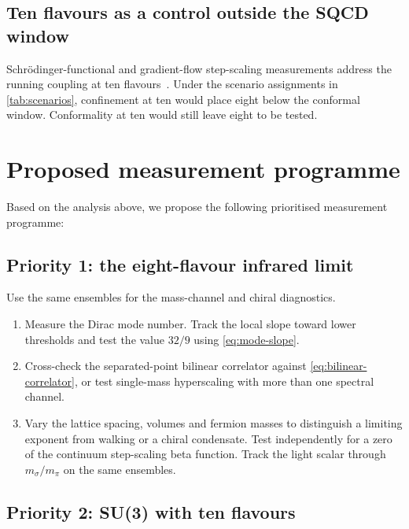 \documentclass[11pt,a4paper]{article}
\theoremstyle{plain}
\theoremstyle{definition}
\theoremstyle{remark}
\begin{document}
\subsection{Ten flavours as a control outside the SQCD window}

Schr\"odinger-functional and gradient-flow step-scaling measurements
address the running coupling at ten flavours~\cite{Hayakawa2011,HRW2020}.
Under the scenario assignments in \cref{tab:scenarios}, confinement
at ten would place eight below the conformal window.  Conformality at
ten would still leave eight to be tested.

\section{Proposed measurement programme}
\label{sec:programme}

Based on the analysis above, we propose the following prioritised
measurement programme:

\subsection{Priority 1: the eight-flavour infrared limit}

Use the same ensembles for the mass-channel and chiral diagnostics.
\begin{enumerate}[label=(\alph*)]
  \item Measure the Dirac mode number.  Track the local slope toward
    lower thresholds and test the value $32/9$ using \cref{eq:mode-slope}.
  \item Cross-check the separated-point bilinear correlator against
    \cref{eq:bilinear-correlator}, or test single-mass hyperscaling
    with more than one spectral channel.
  \item Vary the lattice spacing, volumes and fermion masses to
    distinguish a limiting exponent from walking or a chiral
    condensate.  Test independently for a zero of the continuum
    step-scaling beta function.  Track the light scalar through
    $m_\sigma/m_\pi$ on the same ensembles.
\end{enumerate}

\subsection{Priority 2: SU(3) with ten flavours}
\end{document}
